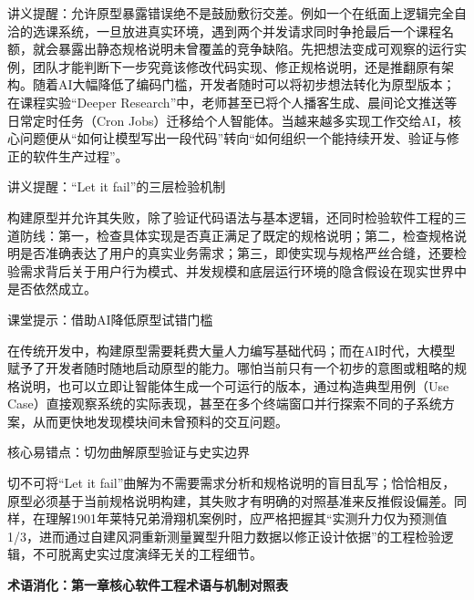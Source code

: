 \documentclass[UTF8,a4paper,11pt,fontset=fandol]{ctexart}
\begin{document}
讲义提醒：允许原型暴露错误绝不是鼓励敷衍交差。例如一个在纸面上逻辑完全自洽的选课系统，一旦放进真实环境，遇到两个并发请求同时争抢最后一个课程名额，就会暴露出静态规格说明未曾覆盖的竞争缺陷。先把想法变成可观察的运行实例，团队才能判断下一步究竟该修改代码实现、修正规格说明，还是推翻原有架构。随着AI大幅降低了编码门槛，开发者随时可以将初步想法转化为原型版本；在课程实验“Deeper Research”中，老师甚至已将个人播客生成、晨间论文推送等日常定时任务（Cron Jobs）迁移给个人智能体。当越来越多实现工作交给AI，核心问题便从“如何让模型写出一段代码”转向“如何组织一个能持续开发、验证与修正的软件生产过程”。

\begin{importantbox}{讲义提醒：“Let it fail”的三层检验机制}

构建原型并允许其失败，除了验证代码语法与基本逻辑，还同时检验软件工程的三道防线：第一，检查具体实现是否真正满足了既定的规格说明；第二，检查规格说明是否准确表达了用户的真实业务需求；第三，即使实现与规格严丝合缝，还要检验需求背后关于用户行为模式、并发规模和底层运行环境的隐含假设在现实世界中是否依然成立。

\end{importantbox}

\begin{knowledgebox}{课堂提示：借助AI降低原型试错门槛}

在传统开发中，构建原型需要耗费大量人力编写基础代码；而在AI时代，大模型赋予了开发者随时随地启动原型的能力。哪怕当前只有一个初步的意图或粗略的规格说明，也可以立即让智能体生成一个可运行的版本，通过构造典型用例（Use Case）直接观察系统的实际表现，甚至在多个终端窗口并行探索不同的子系统方案，从而更快地发现模块间未曾预料的交互问题。

\end{knowledgebox}

\begin{warningbox}{核心易错点：切勿曲解原型验证与史实边界}

切不可将“Let it fail”曲解为不需要需求分析和规格说明的盲目乱写；恰恰相反，原型必须基于当前规格说明构建，其失败才有明确的对照基准来反推假设偏差。同样，在理解1901年莱特兄弟滑翔机案例时，应严格把握其“实测升力仅为预测值1/3，进而通过自建风洞重新测量翼型升阻力数据以修正设计依据”的工程检验逻辑，不可脱离史实过度演绎无关的工程细节。

\end{warningbox}

\par{}\textbf{术语消化：第一章核心软件工程术语与机制对照表}
\end{document}
